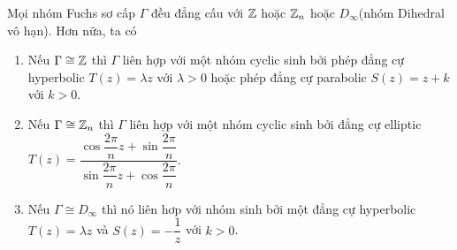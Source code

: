 \begin{thm}\label{ thm 3.4.5}
    Mọi nhóm Fuchs sơ cấp $\Gamma$ đều đẳng cấu với $\mathbb{Z}$ hoặc $\mathbb{Z}_n$ hoặc $D_{\infty}$(nhóm Dihedral vô hạn). Hơn nữa, ta có 
    \begin{enumerate}
        \item Nếu $\Gamma \cong \mathbb{Z}$ thì $\Gamma$ liên hợp với một nhóm cyclic sinh bởi phép đẳng cự hyperbolic $T(z) = \lambda z$ với $\lambda >0$ hoặc phép đẳng cự parabolic $S(z) = z+k$ với $k>0$.

        \item Nếu $\Gamma \cong \mathbb{Z}_n$ thì $\Gamma$ liên hợp với một nhóm cyclic sinh bởi đẳng cự elliptic $T(z) = \dfrac{\cos\dfrac{2\pi}{n}z+\sin\dfrac{2\pi}{n}}{\sin\dfrac{2\pi}{n}z+\cos\dfrac{2\pi}{n}}$.

        \item Nếu $\Gamma \cong D_{\infty}$ thì nó liên hơp với nhóm sinh bởi một đẳng cự hyperbolic $T(z) = \lambda z$ và $S(z) = -\dfrac{1}{z}$ với $k>0$.
    \end{enumerate}
\end{thm}
